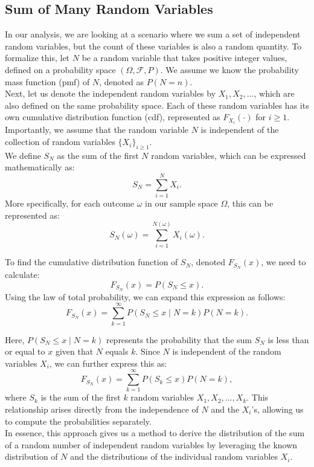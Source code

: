 \subsection{Sum of Many Random Variables}

In our analysis, we are looking at a scenario where we sum a set of independent random variables, but the count of these variables is also a random quantity. To formalize this, let \( N \) be a random variable that takes positive integer values, defined on a probability space \((\Omega, \mathcal{F}, P)\). We assume we know the probability mass function (pmf) of \( N \), denoted as \( P(N = n) \).\\

Next, let us denote the independent random variables by \( X_1, X_2, \ldots \), which are also defined on the same probability space. Each of these random variables has its own cumulative distribution function (cdf), represented as \( F_{X_i}(\cdot) \) for \( i \geq 1 \). Importantly, we assume that the random variable \( N \) is independent of the collection of random variables \( \{X_i\}_{i \geq 1} \).\\

We define \( S_N \) as the sum of the first \( N \) random variables, which can be expressed mathematically as:
\[
S_N = \sum_{i=1}^{N} X_i.
\]
More specifically, for each outcome \( \omega \) in our sample space \( \Omega \), this can be represented as:
\[
S_N(\omega) = \sum_{i=1}^{N(\omega)} X_i(\omega).
\]

To find the cumulative distribution function of \( S_N \), denoted \( F_{S_N}(x) \), we need to calculate:
\[
F_{S_N}(x) = P(S_N \leq x).
\]
Using the law of total probability, we can expand this expression as follows:
\[
F_{S_N}(x) = \sum_{k=1}^{\infty} P(S_N \leq x \mid N = k) P(N = k).
\]

Here, \( P(S_N \leq x \mid N = k) \) represents the probability that the sum \( S_N \) is less than or equal to \( x \) given that \( N \) equals \( k \). Since \( N \) is independent of the random variables \( X_i \), we can further express this as:
\[
F_{S_N}(x) = \sum_{k=1}^{\infty} P(S_k \leq x) P(N = k),
\]
where \( S_k \) is the sum of the first \( k \) random variables \( X_1, X_2, \ldots, X_k \). This relationship arises directly from the independence of \( N \) and the \( X_i \)'s, allowing us to compute the probabilities separately. \\

In essence, this approach gives us a method to derive the distribution of the sum of a random number of independent random variables by leveraging the known distribution of \( N \) and the distributions of the individual random variables \( X_i \).

